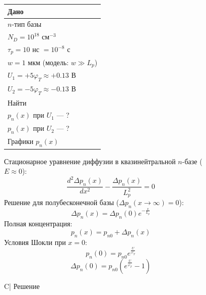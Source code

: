 \documentclass[12pt,a4paper]{article}
\theoremstyle{plain}
\theoremstyle{definition}
\theoremstyle{remark}
\numberwithin{equation}{section}
\begin{document}
\begin{figure}[H]
    \centering
    \begin{minipage}[t]{0.3\textwidth}
    \vspace{0em}
    \begin{tabularx}{\textwidth}{|X|}
        \hline
        \multicolumn{1}{|C|}{Дано} \\
        \hline
        $n$-тип базы \\
        $N_D = 10^{18}$ см$^{-3}$ \\
        $\tau_p = 10$ нс $= 10^{-8}$ с \\
        $w = 1$ мкм (модель: $w \gg L_p$) \\
        $U_1 = +5\varphi_T \approx +0.13$ В \\
        $U_2 = -5\varphi_T \approx -0.13$ В \\
        \hline
        \multicolumn{1}{|C|}{Найти} \\
        \hline
        $p_n(x)$ при $U_1$ — ? \\
        $p_n(x)$ при $U_2$ — ? \\
        Графики $p_n(x)$ \\
        \hline
    \end{tabularx}

    \vspace{0.8em}
    Стационарное уравнение диффузии в квазинейтральной $n$-базе ($E \approx 0$):
    \begin{equation*}
        \frac{d^2 \Delta p_n(x)}{dx^2} - \frac{\Delta p_n(x)}{L_p^2} = 0
    \end{equation*}
    Решение для полубесконечной базы ($\Delta p_n(x \to \infty) = 0$):
    \begin{equation*}
        \Delta p_n(x) = \Delta p_n(0) e^{-\frac{x}{L_p}}
    \end{equation*}
    Полная концентрация:
    \begin{equation*}
        p_n(x) = p_{n0} + \Delta p_n(x)
    \end{equation*}
    Условия Шокли при $x = 0$:
    \begin{equation*}
        p_n(0) = p_{n0} e^{\frac{U}{\varphi_T}}
    \end{equation*}
    \begin{equation*}
        \Delta p_n(0) = p_{n0}\left(e^{\frac{U}{\varphi_T}} - 1\right)
    \end{equation*}
    \end{minipage}\hfill\begin{minipage}[t]{0.7\textwidth}
        \vspace{0em}
        \begin{tabularx}{\textwidth}{C|}
            \hline
            Решение \\
            \hline
        \end{tabularx}


\end{minipage}
\end{figure}
\end{document}
